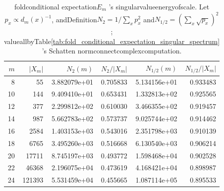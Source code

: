 \begin{table}[H]
\centering
\scriptsize
\setlength{\tabcolsep}{6pt}
\caption{foldconditional expectation$E_m$ 's singularvalueenergyofscale. Let$p_x\propto d_m(x)^{-1}$, andDefinition$N_2=1/\sum_x p_x^2$ and$N_{1/2}=(\sum_x\sqrt{p_x})^2$; valueallbyTable\ref{tab:fold_conditional_expectation_singular_spectrum} 's  Schatten normconnectcomplexcomputation.}
\label{tab:fold_conditional_expectation_effective_support}
\begin{tabular}{r r r r r r}
\toprule
$m$ & $|X_m|$ & $N_2(m)$ & $N_2/|X_m|$ & $N_{1/2}(m)$ & $N_{1/2}/|X_m|$\\
\midrule
8 & 55 & 3.882079e+01 & 0.705833 & 5.134156e+01 & 0.933483\\
10 & 144 & 9.409410e+01 & 0.653431 & 1.332813e+02 & 0.925565\\
12 & 377 & 2.299812e+02 & 0.610030 & 3.466355e+02 & 0.919457\\
14 & 987 & 5.662783e+02 & 0.573737 & 9.025744e+02 & 0.914462\\
16 & 2584 & 1.403153e+03 & 0.543016 & 2.351798e+03 & 0.910139\\
18 & 6765 & 3.495260e+03 & 0.516668 & 6.130540e+03 & 0.906214\\
20 & 17711 & 8.745197e+03 & 0.493772 & 1.598468e+04 & 0.902528\\
22 & 46368 & 2.196075e+04 & 0.473619 & 4.168421e+04 & 0.898987\\
24 & 121393 & 5.531459e+04 & 0.455665 & 1.087114e+05 & 0.895533\\
\bottomrule
\end{tabular}
\end{table}
